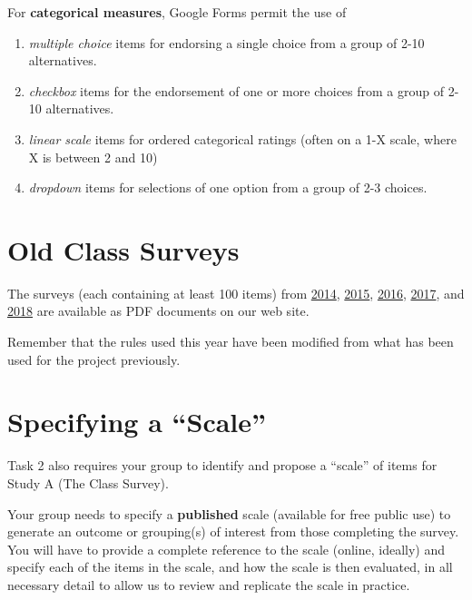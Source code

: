 \documentclass[]{book}
\providecommand{\tightlist}{%
  \setlength{\itemsep}{0pt}\setlength{\parskip}{0pt}}
\begin{document}
For \textbf{categorical measures}, Google Forms permit the use of

\begin{enumerate}
\def\labelenumi{\arabic{enumi}.}
\tightlist
\item
  \emph{multiple choice} items for endorsing a single choice from a group of 2-10 alternatives.
\item
  \emph{checkbox} items for the endorsement of one or more choices from a group of 2-10 alternatives.
\item
  \emph{linear scale} items for ordered categorical ratings (often on a 1-X scale, where X is between 2 and 10)
\item
  \emph{dropdown} items for selections of one option from a group of 2-3 choices.
\end{enumerate}

\hypertarget{old-class-surveys}{%
\section{Old Class Surveys}\label{old-class-surveys}}

The surveys (each containing at least 100 items) from \href{https://github.com/THOMASELOVE/2019-431-project/blob/master/oldsurveys/2014_431_class_survey.pdf}{2014}, \href{https://github.com/THOMASELOVE/2019-431-project/blob/master/oldsurveys/2015_431_class_survey.pdf}{2015}, \href{https://github.com/THOMASELOVE/2019-431-project/blob/master/oldsurveys/2016_431_class_survey.pdf}{2016}, \href{https://github.com/THOMASELOVE/2019-431-project/blob/master/oldsurveys/2017_431_class_survey.pdf}{2017}, and
\href{https://github.com/THOMASELOVE/2019-431-project/blob/master/oldsurveys/2017_431_class_survey.pdf}{2018} are available as PDF documents on our web site.

Remember that the rules used this year have been modified from what has been used for the project previously.

\hypertarget{specifying-a-scale}{%
\section{Specifying a ``Scale''}\label{specifying-a-scale}}

Task 2 also requires your group to identify and propose a ``scale'' of items for Study A (The Class Survey).

Your group needs to specify a \textbf{published} scale (available for free public use) to generate an outcome or grouping(s) of interest from those completing the survey. You will have to provide a complete reference to the scale (online, ideally) and specify each of the items in the scale, and how the scale is then evaluated, in all necessary detail to allow us to review and replicate the scale in practice.
\end{document}
